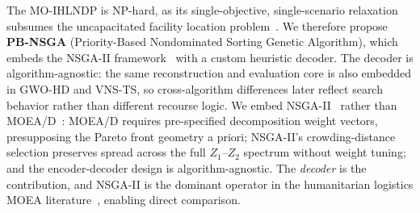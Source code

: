 \documentclass{llncs}
\begin{document}

The MO-IHLNDP is NP-hard, as its single-objective, single-scenario relaxation subsumes the uncapacitated facility location problem~\cite{mirchandani1990discrete}. 
We therefore propose \textbf{PB-NSGA} (Priority-Based Nondominated Sorting Genetic Algorithm), which embeds the NSGA-II framework~\cite{deb2002fast} with a custom heuristic decoder.
The decoder is algorithm-agnostic: the same reconstruction and evaluation core is also embedded in GWO-HD and VNS-TS, so cross-algorithm differences later reflect search behavior rather than different recourse logic.
We embed NSGA-II~\cite{deb2002fast} rather than MOEA/D~\cite{zhang2007moead}: MOEA/D requires pre-specified decomposition weight vectors, presupposing the Pareto front geometry a priori; NSGA-II's crowding-distance selection preserves spread across the full $Z_1$--$Z_2$ spectrum without weight tuning; and the encoder-decoder design is algorithm-agnostic. The \emph{decoder} is the contribution, and NSGA-II is the dominant operator in the humanitarian logistics MOEA literature~\cite{Zhou2017,Li2023}, enabling direct comparison.
\end{document}
